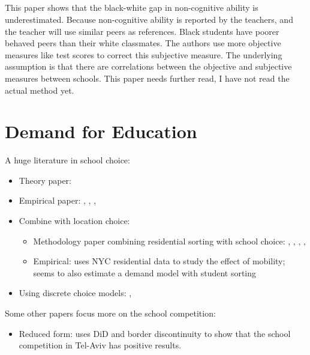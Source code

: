 \paragraph{\citet[AEJ:AE]{ElderZhou2020}} This paper shows that the black-white gap in non-cognitive ability is underestimated. 
Because non-cognitive ability is reported by the teachers, and the teacher will use similar peers as references. 
Black students have poorer behaved peers than their white classmates.
The authors use more objective measures like test scores to correct this subjective measure.
The underlying assumption is that there are correlations between the objective and subjective measures between schools.
This paper needs further read, I have not read the actual method yet.






\chapter{Demand for Education}

A huge literature in school choice:
\begin{itemize}
    \item Theory paper: \textcite{BarseghyanClarkCoate2019}
    \item Empirical paper: \citet{HastingsKaneStaiger2009}, \citet*{DemingHastingsKaneEtAl2014}, \citet*{BurgessGreavesVignolesEtAl2015}, \textcite{Walters2018}
    \item Combine with location choice:   
    \begin{itemize}
        \item Methodology paper combining residential sorting with school choice: \textcite{Rothstein2006}, \textcite{BayerTimmins2007}, \textcite{BayerFerreiraMcMillan2007}, \textcite{BayerMcMillan2010}, \Textcite{BayerMcMillanMurphyEtAl2016}
        \item Empirical: \textcite{CordesSchwartzStiefel2019} uses NYC residential data to study the effect of mobility; \citet{EppleJhaSieg2018} seems to also estimate a demand model with student sorting
    \end{itemize}
    \item Using discrete choice models: \citet{Allende2019}, \citet{Neilson2018}
\end{itemize}

Some other papers focus more on the school competition:
\begin{itemize}
    \item Reduced form: \textcite{Lavy2010} uses DiD and border discontinuity to show that the school competition in Tel-Aviv has positive results.
\end{itemize}

